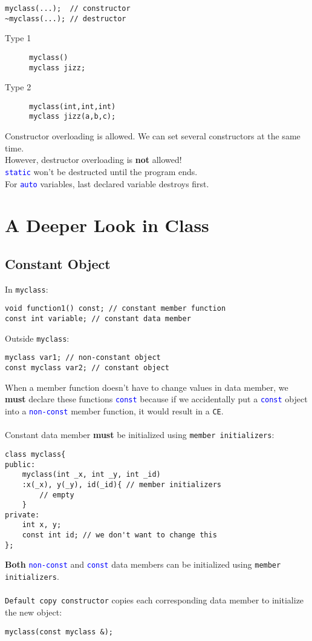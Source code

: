\documentclass[12pt,a4paper]{article}
\begin{document}
			\begin{lstlisting}
myclass(...);  // constructor
~myclass(...); // destructor
\end{lstlisting}
			\begin{description}
				\item[Type 1]
					\texttt{myclass()}\\
					\texttt{myclass jizz;}
				\item[Type 2]
					\texttt{myclass(int,int,int)}\\
					\texttt{myclass jizz(a,b,c);}
			\end{description}
			Constructor overloading is allowed. We can set several constructors at the same time.\\
			However, destructor overloading is \textbf{not} allowed!\\
			\texttt{\textcolor{blue}{static}} won't be destructed until the program ends.\\
			For \texttt{\textcolor{blue}{auto}} variables, last declared variable destroys first.\\
			
	\section{A Deeper Look in Class}	
		\subsection{Constant Object}
			In \texttt{myclass}:
			\begin{lstlisting}
void function1() const; // constant member function
const int variable; // constant data member
\end{lstlisting}
			Outside \texttt{myclass}:
			\begin{lstlisting}
myclass var1; // non-constant object
const myclass var2; // constant object
\end{lstlisting}
			When a member function doesn't have to change values in data member, we \textbf{must} declare these functions \texttt{\textcolor{blue}{const}} because if we accidentally put a \texttt{\textcolor{blue}{const}} object into a \texttt{\textcolor{blue}{non-const}} member function, it would result in a \texttt{\textcolor{mygray}{CE}}.\\\\
			Constant data member \textbf{must} be initialized using \texttt{member initializers}:
			\begin{lstlisting}
class myclass{
public:
	myclass(int _x, int _y, int _id)
	:x(_x), y(_y), id(_id){ // member initializers
		// empty
	}
private:
	int x, y;
	const int id; // we don't want to change this
};
\end{lstlisting}
			\textbf{Both} \texttt{\textcolor{blue}{non-const}} and \texttt{\textcolor{blue}{const}} data members can be initialized using \texttt{member initializers}.\\\\
			\texttt{Default copy constructor} copies each corresponding data member to initialize the new object:
			\begin{lstlisting}
myclass(const myclass &);
\end{lstlisting}
			
\end{document}
